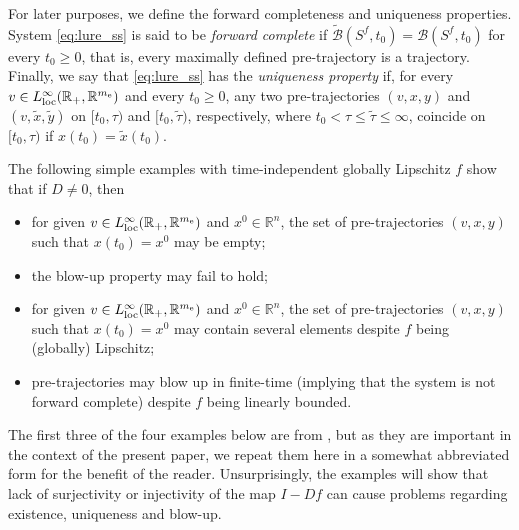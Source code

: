 \documentclass[a4paper,11pt]{article}
\newcommand{\R}{\mathbb R}
\newcommand{\sB}{{\mathcal B}}
\numberwithin{equation}{section}
\numberwithin{figure}{section}
\numberwithin{table}{section}
\begin{document}
For later purposes, we define the forward completeness and uniqueness properties.
System \eqref{eq:lure_ss} is said to be {\it forward complete} if $\tilde\sB(S^f,t_0)=
\sB(S^f,t_0)$ for every $t_0\geq 0$, that is, every maximally defined
pre-trajectory is a trajectory. Finally, we say that \eqref{eq:lure_ss}
has the {\it uniqueness property} if, for every~$v\in L^\infty_{\rm loc}(\R_+,\R^{m_{\rm e}})$ and every $t_0\geq 0$, any two pre-trajectories
$(v,x,y)$ and $(v,\tilde x, \tilde y)$ on $[t_0,\tau)$ and $[t_0,\tilde\tau)$,
respectively, where $t_0<\tau\leq\tilde\tau\leq\infty$, coincide on $[t_0,\tau)$ if $x(t_0)=\tilde x(t_0)$.

%
The following simple examples with time-independent globally Lipschitz $f$ show that if $D\not=0$, then
\begin{itemize}
\item for given $v\in L^\infty_{\rm loc}(\R_+,\R^{m_{\rm e}})$ and $x^0\in\R^n$, the set of pre-trajectories $(v,x,y)$ such that $x(t_0)=x^0$ may be empty;
\item the blow-up property may fail to hold;
\item for given $v\in L^\infty_{\rm loc}(\R_+,\R^{m_{\rm e}})$ and $x^0\in\R^n$, the set of pre-trajectories $(v,x,y)$ such that $x(t_0)=x^0$ may contain several elements despite $f$ being (globally) Lipschitz;
\item pre-trajectories may blow up in finite-time (implying that the system is not forward complete) despite $f$ being linearly bounded.
\end{itemize}
The first three of the four examples below are from \cite{gl24}, but as they are important in the context of the present paper, we repeat them here in a somewhat abbreviated form for the benefit of the reader. Unsurprisingly, the examples will show that lack of surjectivity or injectivity of the map $I-Df$ can cause problems regarding existence, uniqueness and blow-up.
%
\end{document}
